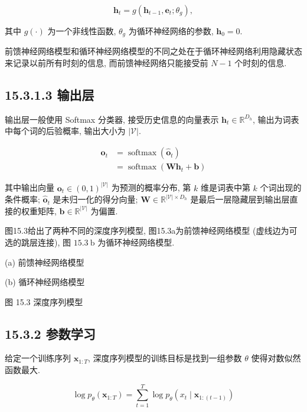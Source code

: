\documentclass[10pt]{article}
\begin{document}
\begin{equation*}
\boldsymbol{h}_{t}=g\left(\boldsymbol{h}_{t-1}, \boldsymbol{e}_{t} ; \theta_{g}\right), \tag{15.28}
\end{equation*}


其中 $g(\cdot)$ 为一个非线性函数, $\theta_{g}$ 为循环神经网络的参数, $\boldsymbol{h}_{0}=0$.

前馈神经网络模型和循环神经网络模型的不同之处在于循环神经网络利用隐藏状态来记录以前所有时刻的信息, 而前馈神经网络只能接受前 $N-1$ 个时刻的信息.

\subsection*{15.3.1.3 输出层}
输出层一般使用 Softmax 分类器, 接受历史信息的向量表示 $\boldsymbol{h}_{t} \in \mathbb{R}^{D_{h}}$, 输出为词表中每个词的后验概率, 输出大小为 $|\mathcal{V}|$.


\begin{align*}
\boldsymbol{o}_{t} & =\operatorname{softmax}\left(\hat{\boldsymbol{o}}_{t}\right)  \tag{15.29}\\
& =\operatorname{softmax}\left(\boldsymbol{W} \boldsymbol{h}_{t}+\boldsymbol{b}\right) \tag{15.30}
\end{align*}


其中输出向量 $\boldsymbol{o}_{t} \in(0,1)^{|\mathcal{V}|}$ 为预测的概率分布, 第 $k$ 维是词表中第 $k$ 个词出现的条件概率; $\hat{\boldsymbol{o}}_{t}$ 是未归一化的得分向量; $\boldsymbol{W} \in \mathbb{R}^{|\mathcal{V}| \times D_{h}}$ 是最后一层隐藏层到输出层直接的权重矩阵, $\boldsymbol{b} \in \mathbb{R}^{|\mathcal{V}|}$ 为偏置.

图15.3给出了两种不同的深度序列模型, 图15.3a为前馈神经网络模型 (虚线边为可选的跳层连接), 图 $15.3 \mathrm{~b}$ 为循环神经网络模型.



(a) 前馈神经网络模型



(b) 循环神经网络模型

图 15.3 深度序列模型

\subsection*{15.3.2 参数学习}
给定一个训练序列 $\boldsymbol{x}_{1: T}$, 深度序列模型的训练目标是找到一组参数 $\theta$ 使得对数似然函数最大.

$$
\log p_{\theta}\left(\boldsymbol{x}_{1: T}\right)=\sum_{t=1}^{T} \log p_{\theta}\left(x_{t} \mid \boldsymbol{x}_{1:(t-1)}\right)
$$
\end{document}
